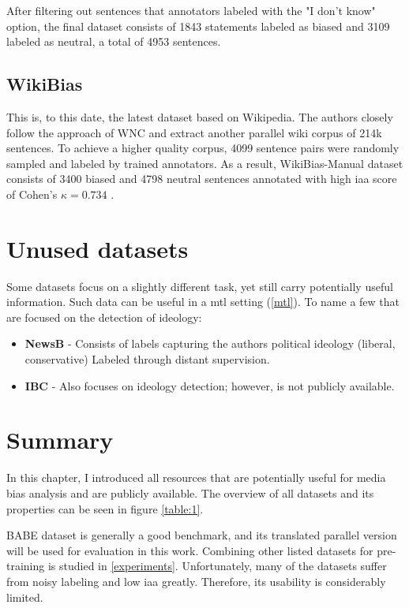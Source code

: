 After filtering out sentences that annotators labeled with the "I don't know" option, the final dataset consists of 1843 statements labeled as biased and 3109 labeled as neutral, a total of 4953 sentences.




\subsection{WikiBias}
This is, to this date, the latest dataset based on Wikipedia. The authors \cite{zhong-etal-2021-wikibias-detecting} closely follow the approach of WNC \cite{pryzant2020automatically} and extract another parallel wiki corpus of 214k sentences.
To achieve a higher quality corpus, 4099 sentence pairs were randomly sampled and labeled by trained annotators. As a result, WikiBias-Manual dataset consists of 3400 biased and 4798 neutral sentences annotated with high \gls{iaa} score of Cohen's $\kappa = 0.734$ \cite{cohen1960coefficient}.





\section{Unused datasets}
 Some datasets focus on a slightly different task, yet still carry potentially useful information. Such data can be useful in a \gls{mtl} setting (\ref{mtl}). To name a few that are focused on the detection of ideology:
\begin{itemize}
\item \textbf{NewsB} - 
Consists of labels capturing the authors political ideology (liberal, conservative) Labeled through distant supervision.
\item \textbf{IBC} - Also focuses on ideology detection; however, is not publicly available.
\end{itemize}


\section{Summary}
In this chapter, I introduced all resources that are potentially useful for media bias analysis and are publicly available. The overview of all datasets and its properties can be seen in figure \ref{table:1}.

BABE dataset is generally a good benchmark, and its translated parallel version will be used for evaluation in this work. Combining other listed datasets for pre-training is studied in \ref{experiments}. Unfortunately, many of the datasets suffer from noisy labeling and low \gls{iaa} greatly. Therefore, its usability is considerably limited.

